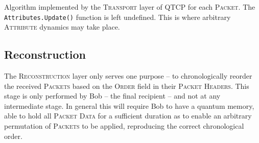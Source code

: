 \documentclass[aps, rmp, twocolumn, amsmath, amssymb, nofootinbib, superscriptaddress, longbibliography, floatfix, table-of-contents, eqsecnum]{revtex4-1}
\begin{document}
\begin{table}[!htb]
\caption{Algorithm implemented by the \textsc{Transport} layer of QTCP for each \textsc{Packet}. The \texttt{Attributes.Update()} function is left undefined. This is where arbitrary \textsc{Attribute} dynamics may take place.} \label{alg:transport_alg}
\end{table}

%
%

\subsection{Reconstruction} 

The \textsc{Reconstruction} layer only serves one purpose -- to chronologically reorder the received \textsc{Packets} based on the \textsc{Order} field in their \textsc{Packet Headers}. This stage is only performed by Bob -- the final recipient -- and not at any intermediate stage. In general this will require Bob to have a quantum memory, able to hold all \textsc{Packet Data} for a sufficient duration as to enable an arbitrary permutation of \textsc{Packets} to be applied, reproducing the correct chronological order.
\end{document}

